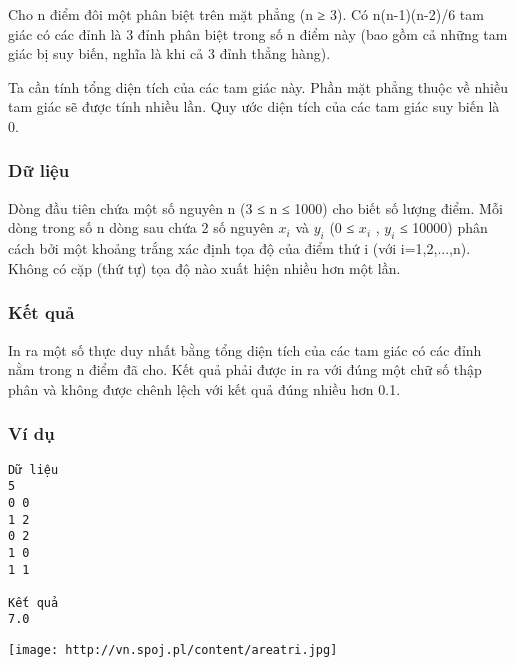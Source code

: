 



   Cho n điểm đôi một phân biệt trên mặt phẳng (n ≥ 3). Có n(n-1)(n-2)/6 tam giác có các đỉnh là 3 đỉnh phân biệt trong số n điểm này (bao gồm cả những tam giác bị suy biến, nghĩa là khi cả 3 đỉnh thẳng hàng).  

   Ta cần tính tổng diện tích của các tam giác này. Phần mặt phẳng thuộc về nhiều tam giác sẽ được tính nhiều lần. Quy ước diện tích của các tam giác suy biến là 0.  

\subsubsection{   Dữ liệu  }

   Dòng đầu tiên chứa một số nguyên n (3 ≤ n ≤ 1000) cho biết số lượng điểm. Mỗi dòng trong số n dòng sau chứa 2 số nguyên $x_{i}$   và $y_{i}$   (0 ≤ $x_{i}$   , $y_{i}$   ≤ 10000) phân cách bởi một khoảng trắng xác định tọa độ của điểm thứ i (với i=1,2,...,n). Không có cặp (thứ tự) tọa độ nào xuất hiện nhiều hơn một lần.  

\subsubsection{   Kết quả  }

   In ra một số thực duy nhất bằng tổng diện tích của các tam giác có các đỉnh nằm trong n điểm đã cho. Kết quả phải được in ra với đúng một chữ số thập phân và không được chênh lệch với kết quả đúng nhiều hơn 0.1.  

\subsubsection{   Ví dụ  }
\begin{verbatim}
Dữ liệu
5
0 0
1 2
0 2
1 0
1 1

Kết quả
7.0
\end{verbatim}
\texttt{[image: http://vn.spoj.pl/content/areatri.jpg]}
